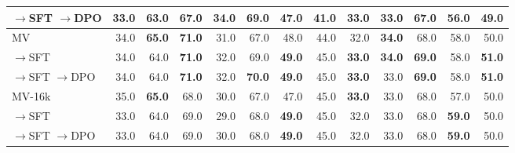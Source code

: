 \begin{table}[htbp]
{\begin{tabular}{lrrrrrrrrrrrr}
\quad $\to$SFT $\to$DPO & 33.0 & 63.0 & 67.0 & 34.0 & 69.0 & 47.0 & 41.0 & \textbf{33.0} & 33.0 & 67.0 & 56.0 & 49.0 \\
\midrule
\addlinespace[0.3em]
MV & 34.0 & \textbf{65.0} & \textbf{71.0} & 31.0 & 67.0 & 48.0 & 44.0 & 32.0 & \textbf{34.0} & 68.0 & 58.0 & 50.0 \\
\quad $\to$SFT & 34.0 & 64.0 & \textbf{71.0} & 32.0 & 69.0 & \textbf{49.0} & 45.0 & \textbf{33.0} & \textbf{34.0} & \textbf{69.0} & 58.0 & \textbf{51.0} \\
\quad $\to$SFT $\to$DPO & 34.0 & 64.0 & \textbf{71.0} & 32.0 & \textbf{70.0} & \textbf{49.0} & 45.0 & \textbf{33.0} & 33.0 & \textbf{69.0} & 58.0 & \textbf{51.0} \\
\midrule
\addlinespace[0.3em]
MV-16k & 35.0 & \textbf{65.0} & 68.0 & 30.0 & 67.0 & 47.0 & 45.0 & \textbf{33.0} & 33.0 & 68.0 & 57.0 & 50.0 \\
\quad $\to$SFT & 33.0 & 64.0 & 69.0 & 29.0 & 68.0 & \textbf{49.0} & 45.0 & 32.0 & 33.0 & 68.0 & \textbf{59.0} & 50.0 \\
\quad $\to$SFT $\to$DPO & 33.0 & 64.0 & 69.0 & 30.0 & 68.0 & \textbf{49.0} & 45.0 & 32.0 & 33.0 & 68.0 & \textbf{59.0} & 50.0 \\
\bottomrule
\end{tabular}
}
\end{table}


